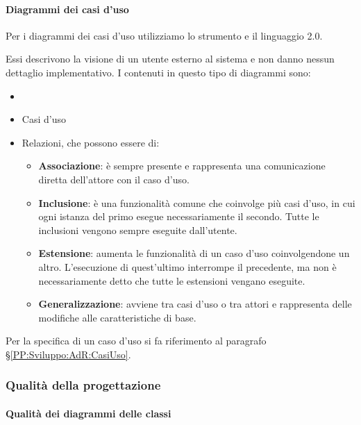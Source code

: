 		\paragraph{Diagrammi dei casi d'uso}\label{PP:Sviluppo:DiagrammiCasiUso}
		Per i diagrammi dei casi d'uso utilizziamo lo strumento  e il linguaggio  2.0.\par
		Essi descrivono la visione di un utente
		esterno al sistema e non danno nessun dettaglio implementativo. I  contenuti in questo tipo di diagrammi sono:
		\begin{itemize}
			\item {}
			\item Casi d'uso
			\item Relazioni, che possono essere di:
			\begin{itemize}
				\item \textbf{Associazione}: è sempre presente e rappresenta una comunicazione diretta dell'attore con il caso d'uso.
				\item \textbf{Inclusione}: è una funzionalità comune che coinvolge più casi d'uso, in cui ogni istanza del primo esegue
					necessariamente il secondo. Tutte le inclusioni vengono sempre eseguite dall'utente.
				\item \textbf{Estensione}: aumenta le funzionalità di un caso d'uso coinvolgendone un altro. L'esecuzione di quest'ultimo interrompe il precedente, ma non è necessariamente detto che tutte le estensioni vengano eseguite.
				\item \textbf{Generalizzazione}: avviene tra casi d'uso o tra attori e rappresenta delle modifiche alle caratteristiche di base.
			\end{itemize}
		\end{itemize}
		Per la specifica di un caso d'uso si fa riferimento al paragrafo \S\ref{PP:Sviluppo:AdR:CasiUso}.


		\subsubsection{Qualità della progettazione}\label{PP:Sviluppo:QualitàProgettazione} %

		\paragraph{Qualità dei diagrammi delle classi} %


